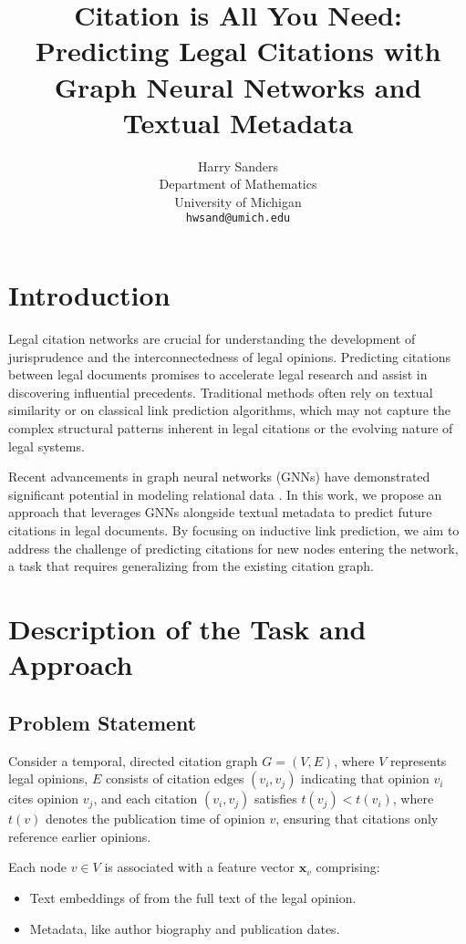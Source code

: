\documentclass{article}
\title{Citation is All You Need:\\ Predicting Legal Citations with Graph Neural Networks and Textual Metadata}
\author{%
  Harry Sanders \\
  Department of Mathematics \\
  University of Michigan \\
  \texttt{hwsand@umich.edu} \\
}
\begin{document}
\maketitle

\section{Introduction}

Legal citation networks are crucial for understanding the development of jurisprudence and the interconnectedness of legal opinions. Predicting citations between legal documents promises to accelerate legal research and assist in discovering influential precedents. Traditional methods often rely on textual similarity or on classical link prediction algorithms, which may not capture the complex structural patterns inherent in legal citations or the evolving nature of legal systems.

Recent advancements in graph neural networks (GNNs) have demonstrated significant potential in modeling relational data \citep{hamilton2018inductive}. In this work, we propose an approach that leverages GNNs alongside textual metadata to predict future citations in legal documents. By focusing on inductive link prediction, we aim to address the challenge of predicting citations for new nodes entering the network, a task that requires generalizing from the existing citation graph.

\section{Description of the Task and Approach}

\subsection{Problem Statement}

Consider a temporal, directed citation graph $G = (V, E)$, where $V$ represents legal opinions, $E$ consists of citation edges \( (v_i, v_j) \) indicating that opinion \( v_i \) cites opinion \( v_j \), and each citation \( (v_i, v_j) \) satisfies \( t(v_j) < t(v_i) \), where \( t(v) \) denotes the publication time of opinion \( v \), ensuring that citations only reference earlier opinions.

Each node \( v \in V \) is associated with a feature vector \( \mathbf{x}_v \) comprising:
\begin{itemize}
    \item Text embeddings of from the full text of the legal opinion.
    \item Metadata, like author biography and publication dates.
\end{itemize}
\end{document}
